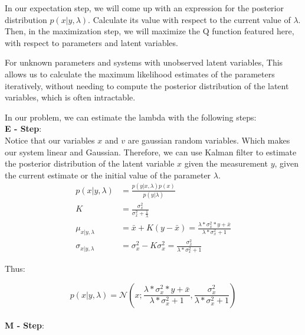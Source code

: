 \documentclass{article}
\begin{document}
In our expectation step, we will come up with an expression for the posterior distribution $p(x|y,\lambda)$. Calculate its value with respect
to the current value of $\lambda$. Then, in the maximization step, we will maximize the Q function featured here, with respect to parameters and 
latent variables.

For unknown parameters and systems with unobserved latent variables, This allows us to calculate the maximum likelihood estimates of the parameters iteratively,
without needing to compute the posterior distribution of the latent variables, which is often intractable.

In our problem, we can estimate the lambda with the following steps:\\
\textbf{E - Step}:\\
Notice that our variables $x$ and $v$ are gaussian random variables. Which makes our system linear and Gaussian. Therefore, we can use Kalman
filter to estimate the posterior distribution of the latent variable $x$ given the measurement $y$, given the current estimate or the initial
value of the parameter $\lambda$. 
\[
    \begin{aligned}
        p(x|y,\lambda) &= \frac{p(y|x,\lambda)p(x)}{p(y|\lambda)} \\
                    K &= \frac{\sigma_x^2}{\sigma_x^2 + \frac{1}{\lambda}}\\
                     \mu_{x|y,\lambda} &= \bar{x} + K(y - \bar{x}) = \frac{\lambda*\sigma_x^2*y+\bar{x}}{\lambda*\sigma_x^2+1} \\
                     \sigma_{x|y,\lambda} &= \sigma_x^2 - K\sigma_x^2 = \frac{\sigma_x^2}{\lambda*\sigma_x^2+1}
    \end{aligned}
\]

Thus: 

\[
    p(x|y,\lambda) = \mathcal{N}\left(x;\frac{\lambda*\sigma_x^2*y+\bar{x}}{\lambda*\sigma_x^2+1}, \frac{\sigma_x^2}{\lambda*\sigma_x^2+1}\right)
\]
\\
\textbf{M - Step}:\\
\end{document}
